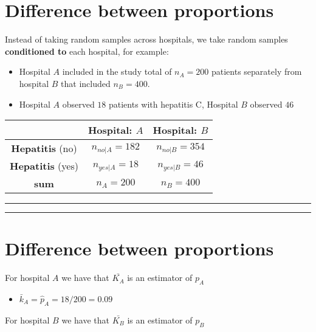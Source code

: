 \documentclass[
]{book}
\providecommand{\tightlist}{%
  \setlength{\itemsep}{0pt}\setlength{\parskip}{0pt}}
\begin{document}
\hypertarget{difference-between-proportions-2}{%
\section{Difference between proportions}\label{difference-between-proportions-2}}

Instead of taking random samples across hospitals, we take random samples \textbf{conditioned to} each hospital, for example:

\begin{itemize}
\item
  Hospital \(A\) included in the study total of \(n_A=200\) patients separately from hospital \(B\) that included \(n_B=400\).
\item
  Hospital \(A\) observed \(18\) patients with hepatitis C, Hospital \(B\) observed \(46\)
\end{itemize}

\begin{longtable}[]{@{}ccc@{}}
\toprule
& Hospital: \(A\) & Hospital: \(B\) \\
\midrule
\endhead
\textbf{Hepatitis} (no) & \(n_{no|A}=182\) & \(n_{no|B}=354\) \\
\textbf{Hepatitis} (yes) & \(n_{yes|A}=18\) & \(n_{yes|B}=46\) \\
\textbf{sum} & \(n_A=200\) & \(n_B=400\) \\
\bottomrule
\end{longtable}

\begin{center}\rule{0.5\linewidth}{0.5pt}\end{center}

\begin{center}\rule{0.5\linewidth}{0.5pt}\end{center}

\hypertarget{difference-between-proportions-3}{%
\section{Difference between proportions}\label{difference-between-proportions-3}}

For hospital \(A\) we have that \(\bar{K_A}\) is an estimator of \(p_A\)

\begin{itemize}
\tightlist
\item
  \(\bar{k}_A=\hat{p}_A=18/200=0.09\)
\end{itemize}

For hospital \(B\) we have that \(\bar{K_B}\) is an estimator of \(p_B\)
\end{document}
